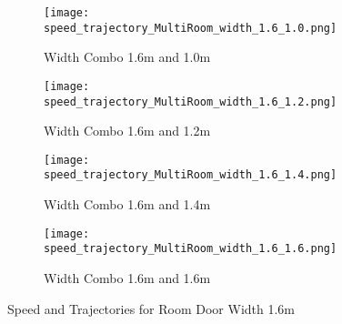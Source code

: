\begin{figure}[h]
    \centering
        \begin{subfigure}[b]{.45\linewidth}
        \texttt{[image: 
            speed\_trajectory\_MultiRoom\_width\_1.6\_1.0.png]}
        \caption{Width Combo 1.6m and 1.0m}
        \label{fig:width_combo_1.6_1.0m}
    \end{subfigure}
    \begin{subfigure}[b]{.45\linewidth}
        \texttt{[image: 
            speed\_trajectory\_MultiRoom\_width\_1.6\_1.2.png]}
        \caption{Width Combo 1.6m and 1.2m}
        \label{fig:width_combo_1.6_1.2m}
    \end{subfigure}

    \begin{subfigure}[b]{.45\linewidth}
        \texttt{[image: 
            speed\_trajectory\_MultiRoom\_width\_1.6\_1.4.png]}
        \caption{Width Combo 1.6m and 1.4m}
        \label{fig:width_combo_1.6_1.4m}
    \end{subfigure}
        \begin{subfigure}[b]{.45\linewidth}
        \texttt{[image: 
            speed\_trajectory\_MultiRoom\_width\_1.6\_1.6.png]}
        \caption{Width Combo 1.6m and 1.6m}
        \label{fig:width_combo_1.6_1.6m}
    \end{subfigure}

    \caption{Speed and Trajectories for Room Door Width 1.6m}
    \label{fig:width_combo_1.6_x}
\end{figure}